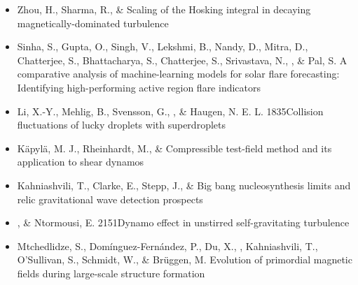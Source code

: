\begin{itemize}
\item[{433.}~]
Zhou, H., Sharma, R., \& \Brandenburg{}
{Scaling of the Hosking integral in decaying magnetically-dominated turbulence}

\item[{432.}~]
Sinha, S., Gupta, O., Singh, V., Lekshmi, B., Nandy, D., Mitra, D., Chatterjee, S., Bhattacharya, S., Chatterjee, S., Srivastava, N., \Brandenburg, \& Pal, S.
{A comparative analysis of machine-learning models for solar flare forecasting: Identifying high-performing active region flare indicators}

\item[{431.}~]
Li, X.-Y., Mehlig, B., Svensson, G., \Brandenburg, \& Haugen, N. E. L.
{1835}{Collision fluctuations of lucky droplets with superdroplets}

\item[{430.}~]
K\"apyl\"a, M. J., Rheinhardt, M., \& \Brandenburg{}
{Compressible test-field method and its application to shear dynamos}

\item[{429.}~]
Kahniashvili, T., Clarke, E., Stepp, J., \& \Brandenburg{}
{Big bang nucleosynthesis limits and relic gravitational wave detection prospects}

\item[{428.}~]
\Brandenburg, \& Ntormousi, E.
{2151}{Dynamo effect in unstirred self-gravitating turbulence}

\item[{427.}~]
Mtchedlidze, S., Dom\'inguez-Fern\'andez, P., Du, X., \Brandenburg, Kahniashvili, T., O'Sullivan, S., Schmidt, W., \& Br\"uggen, M.
{Evolution of primordial magnetic fields during large-scale structure formation}


\end{itemize}

